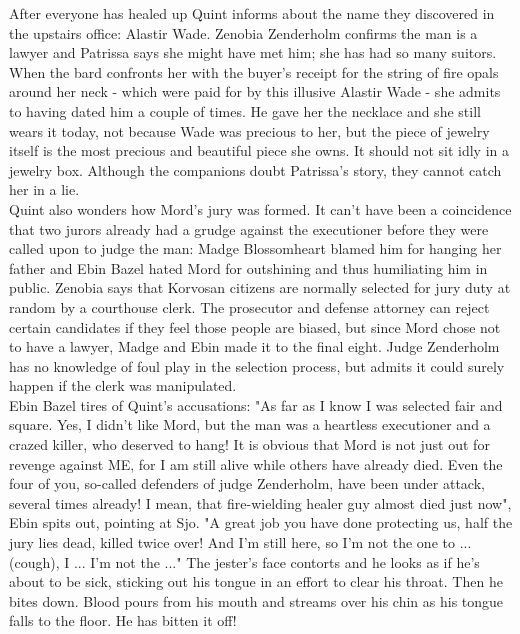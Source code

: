 After everyone has healed up Quint informs about the name they discovered in the upstairs office: Alastir Wade. Zenobia Zenderholm confirms the man is a lawyer and Patrissa says she might have met him; she has had so many suitors. When the bard confronts her with the buyer's receipt for the string of fire opals around her neck - which were paid for by this illusive Alastir Wade - she admits to having dated him a couple of times. He gave her the necklace and she still wears it today, not because Wade was precious to her, but the piece of jewelry itself is the most precious and beautiful piece she owns. It should not sit idly in a jewelry box. Although the companions doubt Patrissa's story, they cannot catch her in a lie.\\

Quint also wonders how Mord's jury was formed. It can't have been a coincidence that two jurors already had a grudge against the executioner before they were called upon to judge the man: Madge Blossomheart blamed him for hanging her father and Ebin Bazel hated Mord for outshining and thus humiliating him in public. Zenobia says that Korvosan citizens are normally selected for jury duty at random by a courthouse clerk. The prosecutor and defense attorney can reject certain candidates if they feel those people are biased, but since Mord chose not to have a lawyer, Madge and Ebin made it to the final eight. Judge Zenderholm has no knowledge of foul play in the selection process, but admits it could surely happen if the clerk was manipulated.\\

Ebin Bazel tires of Quint's accusations: "As far as I know I was selected fair and square. Yes, I didn't like Mord, but the man was a heartless executioner and a crazed killer, who deserved to hang! It is obvious that Mord is not just out for revenge against ME, for I am still alive while others have already died. Even the four of you, so-called defenders of judge Zenderholm, have been under attack, several times already! I mean, that fire-wielding healer guy almost died just now", Ebin spits out, pointing at Sjo. "A great job you have done protecting us, half the jury lies dead, killed twice over! And I'm still here, so I'm not the one to ... (cough), I ... I'm not the ..." The jester's face contorts and he looks as if he's about to be sick, sticking out his tongue in an effort to clear his throat. Then he bites down. Blood pours from his mouth and streams over his chin as his tongue falls to the floor. He has bitten it off!\\

